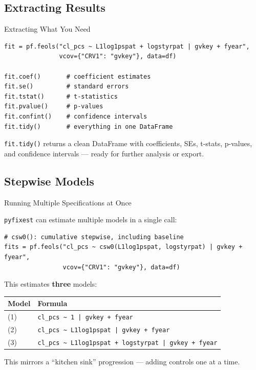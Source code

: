 \documentclass[9pt,aspectratio=169]{beamer}
\newcommand{\py}[1]{\lstinline[language=Python]{#1}}
\begin{document}
\subsection{Extracting Results}
\begin{frame}[fragile]{Extracting What You Need}

\begin{lstlisting}
fit = pf.feols("cl_pcs ~ L1log1pspat + logstyrpat | gvkey + fyear",
               vcov={"CRV1": "gvkey"}, data=df)

fit.coef()       # coefficient estimates
fit.se()         # standard errors
fit.tstat()      # t-statistics
fit.pvalue()     # p-values
fit.confint()    # confidence intervals
fit.tidy()       # everything in one DataFrame
\end{lstlisting}

\medskip

\py{fit.tidy()} returns a clean DataFrame with coefficients, SEs, t-stats, p-values, and confidence intervals --- ready for further analysis or export.

\end{frame}


\subsection{Stepwise Models}
\begin{frame}[fragile]{Running Multiple Specifications at Once}

\texttt{pyfixest} can estimate multiple models in a single call:

\begin{lstlisting}
# csw0(): cumulative stepwise, including baseline
fits = pf.feols("cl_pcs ~ csw0(L1log1pspat, logstyrpat) | gvkey + fyear",
                vcov={"CRV1": "gvkey"}, data=df)
\end{lstlisting}

\smallskip

This estimates \textbf{three} models:

\smallskip

{\small
\begin{tabular}{@{}ll@{}}
\toprule
\textbf{Model} & \textbf{Formula} \\
\midrule
(1) & \texttt{cl\_pcs \textasciitilde{} 1 | gvkey + fyear} \\
(2) & \texttt{cl\_pcs \textasciitilde{} L1log1pspat | gvkey + fyear} \\
(3) & \texttt{cl\_pcs \textasciitilde{} L1log1pspat + logstyrpat | gvkey + fyear} \\
\bottomrule
\end{tabular}}

\smallskip

\begin{highlightbox}
\centering
This mirrors a ``kitchen sink'' progression --- adding controls one at a time.
\end{highlightbox}

\end{frame}
\end{document}
